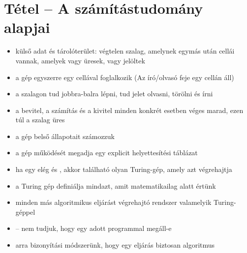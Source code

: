 \documentclass[main.tex]{subfiles}
\begin{document}
  \section{Tétel – A számítástudomány alapjai} %

  \begin{itemize}
    \item külső adat és tárolóterület:
    végtelen szalag, amelynek egymás után cellái vannak,
    amelyek vagy üresek, vagy jelöltek

    \item a gép egyszerre egy cellával foglalkozik
    (Az író/olvasó feje egy cellán áll)

    \item a szalagon tud jobbra-balra lépni,
    tud jelet olvasni, törölni és írni

    \item a bevitel, a számítás és a kivitel minden
    konkrét esetben véges marad, ezen túl a szalag üres

    \item a gép belső állapotait számozzuk
    
    \item a gép működését megadja egy explicit helyettesítési táblázat
    
    \item ha egy  elég
     és ,
    akkor található olyan Turing-gép, amely azt végrehajtja

    \item a Turing gép definiálja mindazt,
    amit matematikailag  alatt értünk

    \item minden más algoritmikus eljárást végrehajtó rendszer
     valamelyik Turing-géppel

    \item {}
    – nem tudjuk, hogy egy adott programmal megáll-e

    \item {} arra bizonyítási módszerünk,
    hogy egy eljárás biztosan algoritmus
  \end{itemize}
\end{document}
